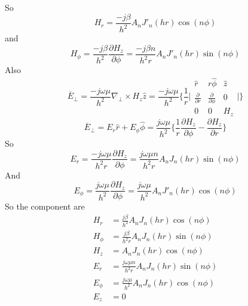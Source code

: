 So 
$$H_r = \frac{-j\beta}{h^2}A_nJ'_n(hr)\cos(n\phi)$$
and
$$ H_\phi = \frac{-j\beta}{h^2}\frac{\partial H_z}{\partial \phi} =  \frac{-j\beta n}{h^2 r}A_nJ'_n(hr)\sin(n\phi)$$	 	
Also
\begin{dmath} 
\overline{E}_\perp = \frac{-j\omega\mu}{h^2}\nabla_\perp\times H_z\hat{z}
=\frac{-j\omega\mu}{h^2}
\bigg\{ 
\frac{1}{r}
\bigg|
\begin{matrix}
\hat{r} &  r\hat{\phi}  &  \hat{z}\\ 
\frac{\partial}{\partial r}  &  \frac{\partial}{\partial \phi}  &  0\\
0  &  0  &  H_z
\end{matrix}
\bigg| 
\bigg\}
\end{dmath}
\begin{dmath}
\overline{E}_\perp = E_r\hat{r} + E_\phi\hat{\phi} = \frac{j\omega\mu}{h^2} \bigg \{ \frac{1}{r}\frac{\partial H_z}{\partial \phi} - \frac{\partial H_z}{\partial r}\bigg\}
\end{dmath}
So 
$$ E_r = \frac{-j\omega\mu}{h^2 r}\frac{\partial H_z}{\partial \phi} = \frac{j\omega\mu n}{h^2 r}A_nJ_n(hr)\sin(n\phi)$$
And
$$ E_\phi = \frac{j\omega\mu}{h^2 }\frac{\partial H_z}{\partial \phi} = \frac{j\omega\mu }{h^2 }A_nJ'_n(hr)\cos(n\phi)$$
So the component are
\begin{align*}
H_r &= \frac{j\beta}{h^2 }A_nJ_n(hr)\cos(n\phi)\\ H_\phi &= \frac{j\beta}{h^2 r}A_nJ_n(hr)\sin(n\phi)\\
H_z &= A_nJ_n(hr)\cos(n\phi)\\
E_r &= \frac{j\omega\mu n}{h^2 r}A_nJ_n(hr)\sin(n\phi)\\
E_\phi &= \frac{j\omega\mu }{h^2 }A_nJ_n(hr)\cos(n\phi)\\
E_z & = 0
\end{align*}

